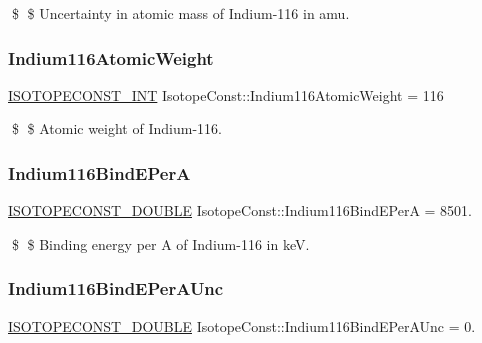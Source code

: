 \$ \$ Uncertainty in atomic mass of Indium-\/116 in amu. \mbox{\label{group___isotope_const-_indium-_in116_gad06433f9ceda1755fe4eeb03e0c87eab}} 
\subsubsection{\texorpdfstring{Indium116\+Atomic\+Weight}{Indium116AtomicWeight}}
{\footnotesize\ttfamily \mbox{\hyperlink{group___isotope_const-_macros_ga5f18360b3e99483a35c32d789e62621c}{I\+S\+O\+T\+O\+P\+E\+C\+O\+N\+S\+T\+\_\+\+I\+NT}} Isotope\+Const\+::\+Indium116\+Atomic\+Weight = 116}

\$ \$ Atomic weight of Indium-\/116. \mbox{\label{group___isotope_const-_indium-_in116_gaaaf3907fc7a8dc9a2ba60c8a15e2ee02}} 
\subsubsection{\texorpdfstring{Indium116\+Bind\+E\+PerA}{Indium116BindEPerA}}
{\footnotesize\ttfamily \mbox{\hyperlink{group___isotope_const-_macros_ga8f45a7272ce02c0b4c65c44636ed719a}{I\+S\+O\+T\+O\+P\+E\+C\+O\+N\+S\+T\+\_\+\+D\+O\+U\+B\+LE}} Isotope\+Const\+::\+Indium116\+Bind\+E\+PerA = 8501.}

\$ \$ Binding energy per A of Indium-\/116 in keV. \mbox{\label{group___isotope_const-_indium-_in116_ga10c9a82eefdbe67ab5516f9c651a1ab2}} 
\subsubsection{\texorpdfstring{Indium116\+Bind\+E\+Per\+A\+Unc}{Indium116BindEPerAUnc}}
{\footnotesize\ttfamily \mbox{\hyperlink{group___isotope_const-_macros_ga8f45a7272ce02c0b4c65c44636ed719a}{I\+S\+O\+T\+O\+P\+E\+C\+O\+N\+S\+T\+\_\+\+D\+O\+U\+B\+LE}} Isotope\+Const\+::\+Indium116\+Bind\+E\+Per\+A\+Unc = 0.}


